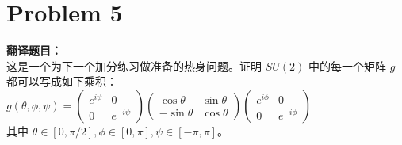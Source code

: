 \documentclass{ctexart}
\begin{document}
\section*{Problem 5}
\textbf{翻译题目：}\\
这是一个为下一个加分练习做准备的热身问题。证明 $SU(2)$ 中的每一个矩阵 $g$ 都可以写成如下乘积：\\
$g(\theta, \phi, \psi) = \begin{pmatrix} e^{i\psi} & 0 \\ 0 & e^{-i\psi} \end{pmatrix} \begin{pmatrix} \cos\theta & \sin\theta \\ -\sin\theta & \cos\theta \end{pmatrix} \begin{pmatrix} e^{i\phi} & 0 \\ 0 & e^{-i\phi} \end{pmatrix}$\\
其中 $\theta \in [0, \pi/2], \phi \in [0, \pi], \psi \in [-\pi, \pi]$。
\end{document}

